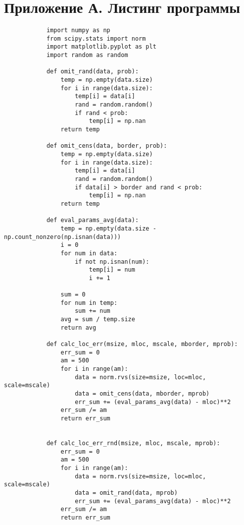 \section{Приложение А. Листинг программы}
        \begin{verbatim}
            import numpy as np
            from scipy.stats import norm
            import matplotlib.pyplot as plt
            import random as random

            def omit_rand(data, prob):
                temp = np.empty(data.size)
                for i in range(data.size):
                    temp[i] = data[i]
                    rand = random.random()
                    if rand < prob:
                        temp[i] = np.nan
                return temp

            def omit_cens(data, border, prob):
                temp = np.empty(data.size)
                for i in range(data.size):
                    temp[i] = data[i]
                    rand = random.random()
                    if data[i] > border and rand < prob:
                        temp[i] = np.nan
                return temp

            def eval_params_avg(data):
                temp = np.empty(data.size - np.count_nonzero(np.isnan(data)))
                i = 0
                for num in data:
                    if not np.isnan(num):
                        temp[i] = num
                        i += 1

                sum = 0
                for num in temp:
                    sum += num
                avg = sum / temp.size
                return avg

            def calc_loc_err(msize, mloc, mscale, mborder, mprob):
                err_sum = 0
                am = 500
                for i in range(am):
                    data = norm.rvs(size=msize, loc=mloc, scale=mscale)
                    data = omit_cens(data, mborder, mprob)
                    err_sum += (eval_params_avg(data) - mloc)**2
                err_sum /= am
                return err_sum


            def calc_loc_err_rnd(msize, mloc, mscale, mprob):
                err_sum = 0
                am = 500
                for i in range(am):
                    data = norm.rvs(size=msize, loc=mloc, scale=mscale)
                    data = omit_rand(data, mprob)
                    err_sum += (eval_params_avg(data) - mloc)**2
                err_sum /= am
                return err_sum


\end{verbatim}
